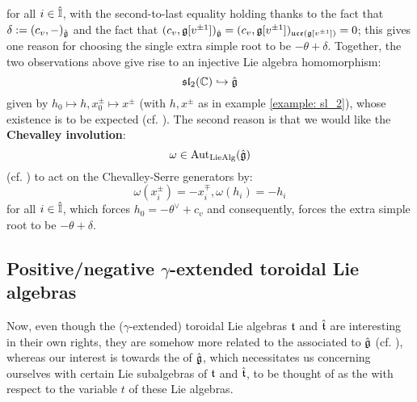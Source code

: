         for all $i \in \hat{\mathbb{I}}$, with the second-to-last equality holding thanks to the fact that $\delta := (c_v, -)_{\hat{\mathfrak{g}}}$ and the fact that $(c_v, \mathfrak{g}[v^{\pm 1}])_{\hat{\mathfrak{g}}} = (c_v, \mathfrak{g}[v^{\pm 1}])_{\mathfrak{uce}(\mathfrak{g}[v^{\pm 1}])} = 0$; this gives one reason for choosing the single extra simple root to be $-\theta + \delta$. Together, the two observations above give rise to an injective Lie algebra homomorphism:
            $$\mathfrak{sl}_2(\mathbb{C}) \hookrightarrow \hat{\mathfrak{g}}$$
        given by $h_0 \mapsto h, x_0^{\pm} \mapsto x^{\pm}$ (with $h, x^{\pm}$ as in example \ref{example: sl_2}), whose existence is to be expected (cf. \cite[Section 3.3]{kac_infinite_dimensional_lie_algebras}). The second reason is that we would like the \textbf{Chevalley involution}:
            $$\omega \in \mathrm{Aut}_{\mathrm{Lie}\mathrm{Alg}}(\hat{\mathfrak{g}})$$
        (cf. \cite[p. 7]{kac_infinite_dimensional_lie_algebras}) to act on the Chevalley-Serre generators by:
            $$\omega(x_i^{\pm}) = -x_i^{\mp}, \omega(h_i) = -h_i$$
        for all $i \in \hat{\mathbb{I}}$, which forces $h_0 = -\theta^{\vee} + c_v$ and consequently, forces the extra simple root to be $-\theta + \delta$.

    \subsection{Positive/negative \texorpdfstring{$\gamma$}{}-extended toroidal Lie algebras}
        Now, even though the  ($\gamma$-extended) toroidal Lie algebras $\mathfrak{t}$ and $\hat{\mathfrak{t}}$ are interesting in their own rights, they are somehow more related to the  associated to $\hat{\mathfrak{g}}$ (cf. \cite[Subsection 2.3 and Section 6]{wendlandt_formal_shift_operators_on_yangian_doubles}), whereas our interest is towards the  of $\hat{\mathfrak{g}}$, which necessitates us concerning ourselves with certain Lie subalgebras of $\mathfrak{t}$ and $\hat{\mathfrak{t}}$, to be thought of as the  with respect to the variable $t$ of these Lie algebras. 

